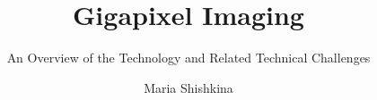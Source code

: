 \documentclass[sigplan,screen]{acmart}
\begin{document}
\title{Gigapixel Imaging}
\subtitle{An Overview of the Technology and Related Technical Challenges}


\author{Maria Shishkina}



\begin{abstract}
 
\end{abstract}
\end{document}
